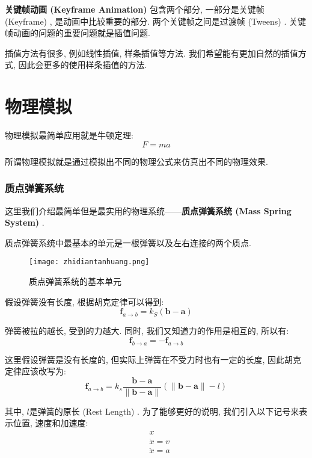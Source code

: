 \documentclass[openany]{progbookcn}
\begin{document}
\textbf{关键帧动画 (Keyframe Animation) }包含两个部分, 一部分是关键帧 (Keyframe) , 是动画中比较重要的部分. 两个关键帧之间是过渡帧 (Tweens) . 关键帧动画的问题的重要问题就是插值问题. 

插值方法有很多, 例如线性插值, 样条插值等方法. 我们希望能有更加自然的插值方式, 因此会更多的使用样条插值的方法. 

\section{物理模拟}

物理模拟最简单应用就是牛顿定理: 
\begin{equation}
	F=ma
\end{equation}

所谓物理模拟就是通过模拟出不同的物理公式来仿真出不同的物理效果. 

\subsubsection{质点弹簧系统}

这里我们介绍最简单但是最实用的物理系统——\textbf{质点弹簧系统 (Mass Spring System) }. 

质点弹簧系统中最基本的单元是一根弹簧以及左右连接的两个质点. 

\begin{figure}[H]
	\centering
	\texttt{[image: zhidiantanhuang.png]}
	\caption{质点弹簧系统的基本单元}
	\label{fig:zdth}
\end{figure}

假设弹簧没有长度, 根据胡克定律可以得到: 
\begin{equation}
	\mathbf{f}_{a \rightarrow b}=k_{S}(\mathbf{b}-\mathbf{a})
\end{equation}

弹簧被拉的越长, 受到的力越大. 同时, 我们又知道力的作用是相互的, 所以有: 
\begin{equation}
	\mathbf{f}_{b \rightarrow a}=-\mathbf{f}_{a \rightarrow b}
\end{equation}

这里假设弹簧是没有长度的, 但实际上弹簧在不受力时也有一定的长度, 因此胡克定律应该改写为: 
\begin{equation}
	\mathbf{f}_{a \rightarrow b}=k_{s} \frac{\mathbf{b}-\mathbf{a}}{\|\mathbf{b}-\mathbf{a}\|}(\|\mathbf{b}-\mathbf{a}\|-l)
\end{equation}

其中, $l$是弹簧的原长 (Rest Length) . 为了能够更好的说明, 我们引入以下记号来表示位置, 速度和加速度: 
\begin{equation}
	\begin{split}
	&	x \\
	&	\dot{x}=v \\
	&	\ddot{x}=a
	\end{split}
\end{equation}
\end{document}
